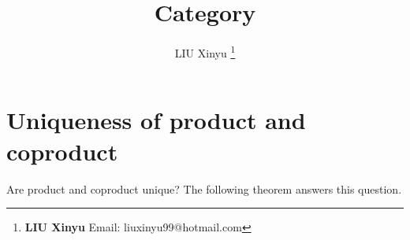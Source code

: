 \documentclass[UTF8]{article}
\begin{document}
\title{Category}

\author{LIU Xinyu
\thanks{{\bfseries LIU Xinyu} \newline
  Email: liuxinyu99@hotmail.com \newline}
  }

\maketitle
\fi


\chapter*{Uniqueness of product and coproduct}

Are product and coproduct unique? The following theorem answers this question.
\end{document}
